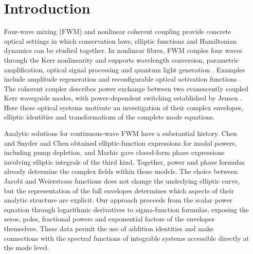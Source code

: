 \documentclass[11pt,a4paper]{article}
\numberwithin{equation}{section}
\begin{document}
\section{Introduction}
Four-wave mixing (FWM) and nonlinear coherent coupling provide concrete optical settings in which conservation laws, elliptic functions and Hamiltonian dynamics can be studied together.
In nonlinear fibres, FWM couples four waves through the Kerr nonlinearity and supports wavelength conversion, parametric amplification, optical signal processing and quantum light generation \cite{agrawalNonlinearFiberOptics2019,marhicFiberOpticalParametric2007}.
Examples include amplitude regeneration \cite{bottrillOptimisationAmplitudeLimiters2016} and reconfigurable optical activation functions \cite{yangReconfigurableOpticalNonlinear2026}.
The coherent coupler describes power exchange between two evanescently coupled Kerr waveguide modes, with power-dependent switching established by Jensen \cite{jensenNonlinearCoherentCoupler1982}.
Here these optical systems motivate an investigation of their complex envelopes, elliptic identities and transformations of the complete mode equations.

Analytic solutions for continuous-wave FWM have a substantial history.
Chen and Snyder \cite{chenFourphotonParametricMixing1989} and Chen \cite{chenFourwaveMixingOptical1989} obtained elliptic-function expressions for modal powers, including pump depletion, and Marhic \cite{marhicAnalyticSolutionsPhases2013} gave closed-form phase expressions involving elliptic integrals of the third kind.
Together, power and phase formulas already determine the complex fields within those models.
The choice between Jacobi and Weierstrass functions does not change the underlying elliptic curve, but the representation of the full envelopes determines which aspects of their analytic structure are explicit.
Our approach proceeds from the scalar power equation through logarithmic derivatives to sigma-function formulas, exposing the zeros, poles, fractional powers and exponential factors of the envelopes themselves.
These data permit the use of addition identities and make connections with the spectral functions of integrable systems accessible directly at the mode level.
\end{document}
